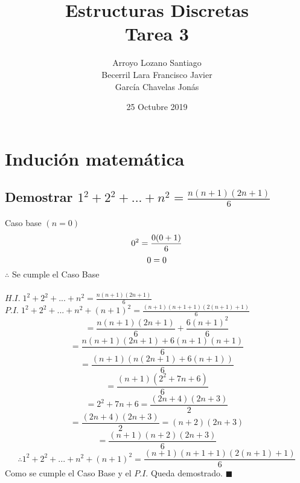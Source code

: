 \documentclass[11pt,letterpaper]{article}
\title{Estructuras Discretas \\ Tarea 3}
\author{Arroyo Lozano Santiago \\ Becerril Lara Francisco Javier \\ García Chavelas Jonás }
\date{25 Octubre 2019}
\renewcommand\qedsymbol{$\blacksquare$}
\begin{document}
   \maketitle

   \section{Indución matemática}
      \subsection{Demostrar $1^{2}+2^{2}+...+n^{2} = \frac{n(n+1)(2n+1)}{6}$}
         \hspace{1cm} Caso base $(n = 0)$ \\
         \begin{equation}\notag 0^{2} = \frac{0(0+1)}{6} \end{equation}
         \begin{equation}\notag 0 = 0 \end{equation}
         $\therefore$ Se cumple el Caso Base \\ \\
         $H.I. \; 1^{2}+2^{2}+...+n^{2} = \frac{n(n+1)(2n+1)}{6}$ \\
         $P.I. \; 1^{2}+2^{2}+...+n^{2}+(n+1)^{2} = \frac{(n+1)(n+1+1)(2(n+1)+1)}{6}$ \\
         \begin{equation}\tag{Por $H.I.$} = \frac{n(n+1)(2n+1)}{6} + \frac{6(n+1)^2}{6} \end{equation}
         \begin{equation}\tag{Desarrollamos} = \frac{n(n+1)(2n+1)+6(n+1)(n+1)}{6} \end{equation}
         \begin{equation}\tag{Factor Común} = \frac{(n+1)(n(2n+1)+6(n+1))}{6} \end{equation}
         \begin{equation}\tag{Desarrollamos} = \frac{(n+1)(2^{2}+7n+6)}{6} \end{equation}
         \begin{equation}\tag{Factor Común} =  2^{2}+7n+6 = \frac{(2n+4)(2n+3)}{2} \end{equation}
         \begin{equation}\tag{Dividimos} = \frac{(2n+4)(2n+3)}{2} = (n+2)(2n+3) \end{equation}
         \begin{equation}\tag{Desarrollamos} = \frac{(n+1)(n+2)(2n+3)}{6} \end{equation}
         \begin{equation}\tag{Conclusión} \therefore 1^{2}+2^{2}+...+n^{2}+(n+1)^{2} = \frac{(n+1)(n+1+1)(2(n+1)+1)}{6} \end{equation}
         Como se cumple el Caso Base y el $P.I.$ Queda demostrado.  \qedsymbol
\end{document}
